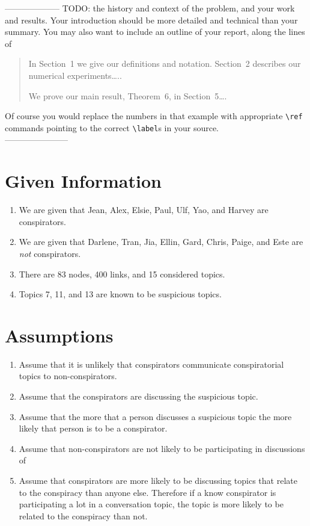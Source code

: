 \documentclass{icmmcm}
\begin{document}
\noindent -------------------- TODO:
the history and context of the problem,
and your work and results.  Your introduction should be more detailed
and technical than your summary.  You may also want to include an
outline of your report, along the lines of
\begin{quotation}
  In Section~1 we give our definitions and notation. Section~2
  describes our numerical experiments\ldots{}..
  
  We prove our main result, Theorem~6, in Section~5\ldots{}.
\end{quotation}
Of course you would replace the numbers in that example with
appropriate \verb|\ref| commands pointing to the correct
\verb|\label|s in your source.\\
-----------------------

\section{Given Information}
\begin{enumerate}
\item We are given that Jean, Alex, Elsie, Paul, Ulf, Yao,
and Harvey are conspirators.
\item We are given that Darlene, Tran, Jia, Ellin, Gard, Chris,
Paige, and Este are \textit{not} conspirators.
\item There are 83 nodes, 400 links, and 15 considered topics.
\item Topics 7, 11, and 13 are known to be suspicious topics.
\end{enumerate}

\section{Assumptions}

\begin{enumerate}
\item Assume that it is unlikely that conspirators communicate
conspiratorial topics to non-conspirators.

\item Assume that the conspirators are discussing the suspicious topic.

\item Assume that the more that a person discusses a suspicious topic the more likely that person is to be a conspirator.  
\item Assume that non-conspirators are not likely to be participating in discussions of 

\item Assume that conspirators are more likely to be discussing topics that relate to the conspiracy than anyone else.
Therefore if a know conspirator is participating a lot in a conversation topic,
the topic is more likely to be related to the conspiracy than not. 
\end{enumerate}
\end{document}
